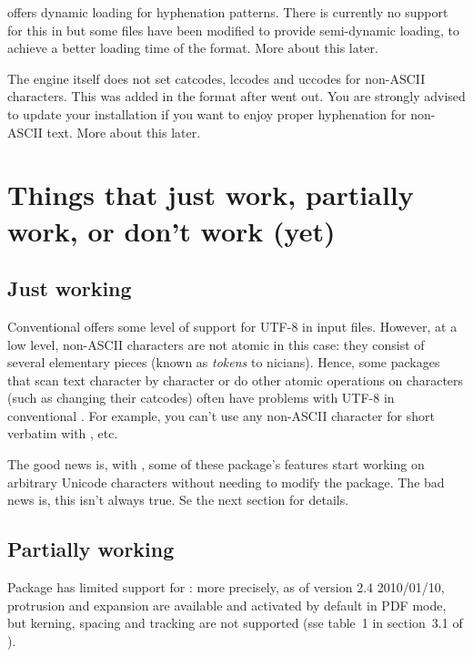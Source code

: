 \documentclass{lltxdoc}
\begin{document}
\luatex offers dynamic loading for hyphenation patterns. There is
currently no support for this in  but some files have been modified
to provide semi-dynamic loading, to achieve a better loading time of the
format. More about this later.

The engine itself does not set catcodes, lccodes and uccodes for non-ASCII
characters. This was added in the format after  went out. You are
strongly advised to update your installation if you want to enjoy proper
hyphenation for non-ASCII text. More about this later.


\section{Things that just work, partially work, or don't work (yet)}
\label{workornot}

\subsection{Just working}\label{working}

Conventional \latex offers some level of support for UTF-8 in input files.
However, at a low level, non-ASCII characters are not atomic in this case:
they consist of several elementary pieces (known as \emph{tokens} to
\tex{}nicians). Hence, some packages that scan text character by character or
do other atomic operations on characters (such as changing their catcodes)
often have problems with UTF-8 in conventional \latex. For example, you can't
use any non-ASCII character for short verbatim with , etc.

The good news is, with \lualatex, some of these package's features start
working on arbitrary Unicode characters without needing to modify the package.
The bad news is, this isn't always true. Se the next section for details.

\subsection{Partially working}\label{partial}

Package  has limited support for \luatex: more precisely, as of
version 2.4 2010/01/10, protrusion and expansion are available and activated
by default in PDF mode, but kerning, spacing and tracking are not supported
(sse table~1 in section~3.1 of ).
\end{document}
